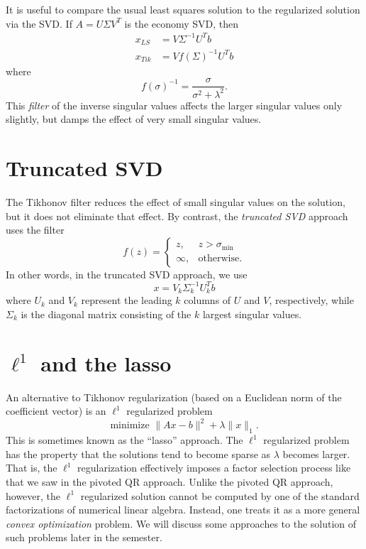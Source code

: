 \documentclass[12pt, leqno]{article}
\begin{document}
It is useful to compare the usual least squares solution to the
regularized solution via the SVD.  If $A = U \Sigma V^T$ is the
economy SVD, then
\begin{align*}
  x_{LS} &= V \Sigma^{-1} U^T b \\
  x_{Tik} &= V f(\Sigma)^{-1} U^T b
\end{align*}
where
\[
  f(\sigma)^{-1} = \frac{\sigma}{\sigma^2 + \lambda^2}.
\]
This {\em filter} of the inverse singular values affects the larger
singular values only slightly, but damps the effect of very small
singular values.

\section{Truncated SVD}

The Tikhonov filter reduces the effect of small singular values on
the solution, but it does not eliminate that effect.  By contrast,
the {\em truncated SVD} approach uses the filter
\[
f(z) =
\begin{cases}
  z, & z > \sigma_{\min} \\
  \infty, & \mbox{otherwise}.
\end{cases}
\]
In other words, in the truncated SVD approach, we use
\[
  x = V_k \Sigma_k^{-1} U_k^T b
\]
where $U_k$ and $V_k$ represent the leading $k$ columns of $U$ and
$V$, respectively, while $\Sigma_k$ is the diagonal matrix consisting
of the $k$ largest singular values.

\section{$\ell^1$ and the lasso}

An alternative to Tikhonov regularization (based on a Euclidean norm
of the coefficient vector) is an $\ell^1$ regularized problem
\[
  \mbox{minimize } \|Ax-b\|^2 + \lambda \|x\|_1.
\]
This is sometimes known as the ``lasso'' approach.  The $\ell^1$
regularized problem has the property that the solutions tend to
become sparse as $\lambda$ becomes larger.  That is, the $\ell^1$
regularization effectively imposes a factor selection process like
that we saw in the pivoted QR approach.  Unlike the pivoted QR
approach, however, the $\ell^1$ regularized solution cannot be
computed by one of the standard factorizations of numerical linear
algebra.  Instead, one treats it as a more general {\em convex
  optimization} problem.  We will discuss some approaches to the
solution of such problems later in the semester.
\end{document}
